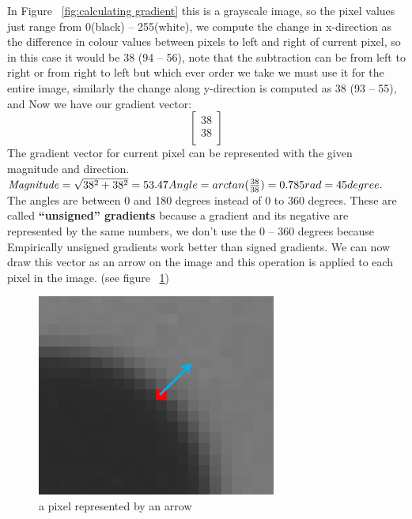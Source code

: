 \newline
In Figure ~\ref{fig:calculating gradient} this is a grayscale image, so the pixel values just range from 0(black) – 255(white), we compute the change in x-direction as the difference in colour values between pixels to left and right of current pixel, so in this case it would be 38 (94 – 56), note that the subtraction can be from left to right or from right to left but which ever order we take we must use it for the entire image, similarly the change along y-direction is computed as 38 (93 – 55), and Now we have our gradient vector:\[ \begin{bmatrix}
38\\
38\\
\end{bmatrix} \]
The gradient vector for current pixel can be represented with the given magnitude and direction.
\newline \newline
\begin{math}
\mathit{Magnitude} = 
\sqrt{38^2 +  38^2} = 53.47 \newline Angle = arctan(\frac{38}{38}) = 0.785 rad = 45 degree.
\end{math}
\newline \newline
The angles are between 0 and 180 degrees instead of 0 to 360 degrees. These are called \textbf{“unsigned” gradients} because a gradient and its negative are represented by the same numbers, we don’t use the 0 – 360 degrees because Empirically unsigned gradients work better than signed gradients.
\newline
We can now draw this vector as an arrow on the image and this operation is applied to each pixel in the image. (see figure ~\ref{fig:pixel representation})

\begin{figure}
	\centering
	\includegraphics[width=0.70\textwidth]{gray_scale.png}
	\caption{a pixel represented by an arrow}
	\label{fig:pixel representation}
\end{figure}
